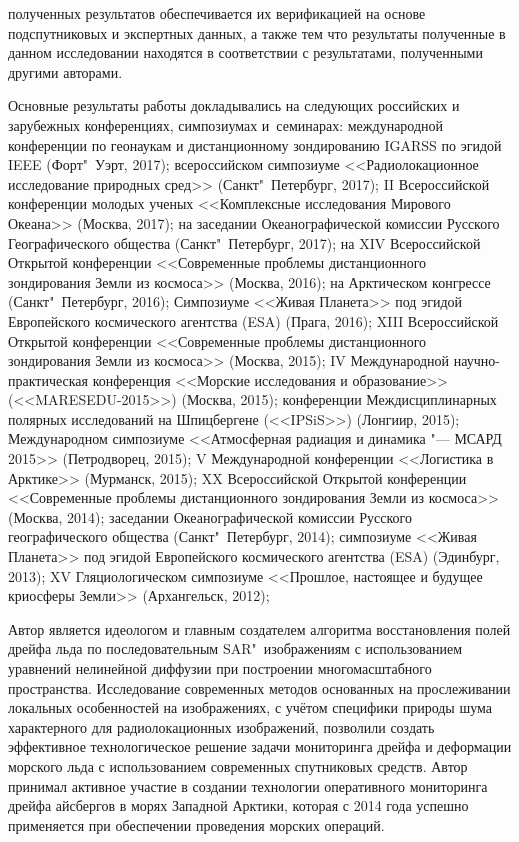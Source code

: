 {\reliability} полученных результатов обеспечивается их верификацией на основе подспутниковых и экспертных данных, а также тем что результаты полученные в данном исследовании находятся в соответствии с результатами, полученными другими авторами. 

{\probation}
Основные результаты работы докладывались на следующих российских и зарубежных конференциях, симпозиумах и~семинарах: международной конференции по геонаукам и дистанционному зондированию IGARSS по эгидой IEEE (Форт"~Уэрт, 2017); всероссийском симпозиуме <<Радиолокационное исследование природных сред>> (Санкт"~Петербург, 2017); II Всероссийской конференции молодых ученых <<Комплексные исследования Мирового Океана>> (Москва, 2017); на заседании Океанографической комиссии Русского Географического общества (Санкт"~Петербург, 2017); на XIV Всероссийской Открытой конференции <<Современные проблемы дистанционного зондирования Земли из космоса>> (Москва, 2016); на Арктическом конгрессе (Санкт"~Петербург, 2016); Симпозиуме <<Живая Планета>> под эгидой Европейского космического агентства (ESA) (Прага, 2016); XIII Всероссийской Открытой конференции <<Современные проблемы дистанционного зондирования Земли из космоса>> (Москва, 2015); IV Международной научно-практическая конференция <<Морские исследования и образование>> (<<MARESEDU-2015>>) (Москва, 2015); конференции Междисциплинарных полярных исследований на Шпицбергене (<<IPSiS>>) (Лонгиир, 2015); Международном симпозиуме <<Атмосферная радиация и динамика "--- МСАРД 2015>> (Петродворец, 2015); V Международной конференции <<Логистика в Арктике>> (Мурманск, 2015); XX Всероссийской Открытой конференции <<Современные проблемы дистанционного зондирования Земли из космоса>> (Москва, 2014); заседании Океанографической комиссии Русского географического общества (Санкт"~Петербург, 2014); симпозиуме <<Живая Планета>> под эгидой Европейского космического агентства (ESA) (Эдинбург, 2013); XV Гляциологическом симпозиуме <<Прошлое, настоящее и будущее криосферы Земли>> (Архангельск, 2012);

{\contribution} Автор является идеологом и главным создателем алгоритма восстановления полей дрейфа льда по последовательным SAR"~изображениям с использованием уравнений нелинейной диффузии при построении многомасштабного пространства. Исследование современных методов основанных на прослеживании локальных особенностей на изображениях, с учётом специфики природы шума характерного для радиолокационных изображений, позволили создать эффективное технологическое решение задачи мониторинга дрейфа и деформации морского льда с использованием современных спутниковых средств. Автор принимал активное участие в создании технологии оперативного мониторинга дрейфа айсбергов в морях Западной Арктики, которая с 2014 года успешно применяется при обеспечении проведения морских операций.


